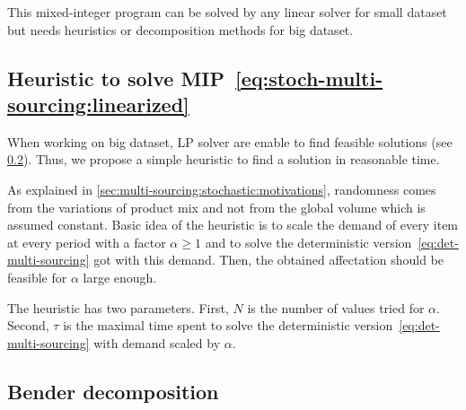 This mixed-integer program can be solved by any linear solver for small dataset but needs heuristics or decomposition methods for big dataset.


\subsection{Heuristic to solve MIP~\eqref{eq:stoch-multi-sourcing:linearized}}


When working on big dataset, LP solver are enable to find feasible solutions (see \cref{}).
Thus, we propose a simple heuristic to find a solution in reasonable time.


As explained in \cref{sec:multi-sourcing:stochastic:motivations}, randomness comes from the variations of product mix and not from the global volume which is assumed constant.
Basic idea of the heuristic is to scale the demand of every item at every period with a factor $\alpha\ge1$ and to solve the deterministic version~\eqref{eq:det-multi-sourcing} got with this demand.
Then, the obtained affectation should be feasible for $\alpha$ large enough.


The heuristic has two parameters.
First, $N$ is the number of values tried for $\alpha$.
Second, $\tau$ is the maximal time spent to solve the deterministic version~\eqref{eq:det-multi-sourcing} with demand scaled by $\alpha$.







\subsection{Bender decomposition}


